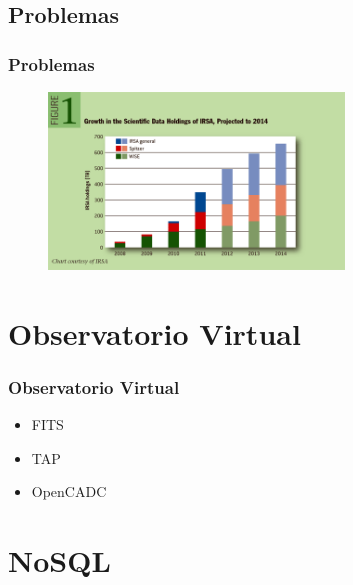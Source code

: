 \documentclass[serif,12pt]{beamer}
\begin{document}
\subsection{Problemas}

\begin{frame}
\frametitle{Problemas}

\begin{figure}
\centering
\includegraphics[width=0.7\textwidth, height=0.7\textheight]{images/data_rates.png} 
\label{fig:data_rates}
\end{figure}


\end{frame}

\section{Observatorio Virtual}
\begin{frame}
\frametitle{Observatorio Virtual}

\begin{itemize}
\item FITS
\item TAP
\item OpenCADC
\end{itemize}

\end{frame}


\section{NoSQL}
\end{document}
